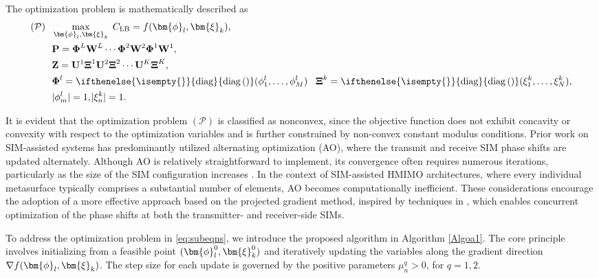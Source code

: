 \documentclass[twocolumn,10pt]{IEEEtran}
\newcommand{\vect}[1]{{\lowercase{\mbs{#1}}}}
\newcommand{\mbs}[1]{\bm{#1}}
\newcommand{\bphi}{\vect{\phi}}
\def\bP{{\mathbf{P}}}
\def\bU{{\mathbf{U}}}
\def\bW{{\mathbf{W}}}
\def\bZ{{\mathbf{Z}}}
\def\bxi{{\bm{\xi}}}
\def\bxi{{\bm{\xi}}}
\def\bXi{{\boldsymbol{\Xi}}}
\newcommand{\diag}[1][]{\ifthenelse{\isempty{#1}}{\text{diag}}{\text{diag}\left(#1\right)}}
\def\bPhi{{\boldsymbol{\Phi}}}
\def\bXi{{\boldsymbol{\Xi}}}
\begin{document}
	The optimization problem is mathematically described as 
	\begin{subequations}\label{eq:subeqns}
		\begin{align}
			(\mathcal{P})~~&\max_{\bphi_{l},\bxi_{k}} 	\;C_{\mathrm{LB}}\label{Maximization1} =f(\bphi_{l},\bxi_{k}),\\
			&	\bP=\bPhi^{L}\bW^{L}\cdots\bPhi^{2}\bW^{2}\bPhi^{1}\bW^{1},
			\label{Maximization3} \\
			&	\bZ=\bU^{1}\bXi^{1}\bU^{2}\bXi^{2}\cdots\bU^{K}\bXi^{K},
			\label{Maximization4} \\
			&		\bPhi^{l}=\diag(\phi^{l}_{1}, \dots, \phi^{l}_{M})\quad \!	\bXi^{k}=\diag(\xi^{k}_{1}, \dots, \xi^{k}_{N}),
			\label{Maximization6} \\
			&	|	\phi^{l}_{m}|=1, 	\!\!\!\!\!\!\!\!\;\;\;\;\;\!\!~\!		|\xi^{k}_{n}|=1	\label{Maximization8}.
		\end{align}
	\end{subequations}
	
	It is evident that the optimization problem $ (\mathcal{P}) $ is classified as nonconvex, since the objective function does not exhibit concavity or convexity with respect to the optimization variables and is further constrained by non-convex constant modulus conditions. Prior work on SIM-assisted systems has predominantly utilized alternating optimization (AO), where the transmit and receive SIM phase shifts are updated alternately. Although AO is relatively straightforward to implement, its convergence often requires numerous iterations, particularly as the size of the SIM configuration  increases \cite{Perovic2021}. In the context of SIM-assisted HMIMO architectures, where every individual metasurface  typically comprises a substantial number of elements, AO becomes computationally inefficient. These considerations encourage the adoption of a more effective approach based on the projected gradient method, inspired by techniques in \cite{Perovic2021}, which enables concurrent optimization of the phase shifts at both the transmitter- and receiver-side SIMs. 	
	
	To address the optimization problem in \eqref{eq:subeqns}, we introduce the proposed algorithm in Algorithm \ref{Algoa1}. The core principle involves initializing from a feasible point 
	$ (\bphi_{l}^{0},\bxi_{k}^{0}) $ and iteratively updating the variables along the gradient direction	 $ \nabla f(\bphi_{l},\bxi_{k}) $. The step size for each update is governed by the positive parameters $\mu_{n}^{q} >0$, for  $ q=1,2 $.
	
\end{document}
